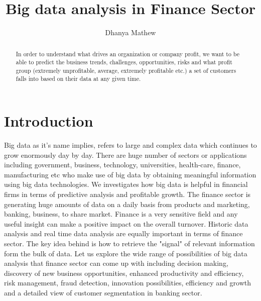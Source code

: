 \documentclass[sigconf]{acmart}
\begin{document}
\title{Big data analysis in Finance Sector}


\author{Dhanya Mathew}

\renewcommand{\shortauthors}{B. Trovato et al.}


\begin{abstract}

In order to understand what drives an organization or company profit, we want to be able to predict the business trends, challenges, opportunities, risks and what profit group (extremely unprofitable, average, extremely profitable etc.) a set of customers falls into based on their data at any given time.

\end{abstract}



\maketitle

\section{Introduction}

Big data as it's name implies, refers to large and complex data which continues to grow enormously day by day. There are huge number of sectors or applications including government, business, technology, universities, health-care, finance, manufacturing etc who make use of big data by obtaining meaningful information using big data technologies.\cite{/wiki/Big_data} We investigates how big data is helpful in financial firms in terms of predictive analysis and profitable growth. The finance sector is generating huge amounts of data on a daily basis from products and marketing, banking, business, to share market. Finance is a very sensitive field and any useful insight can make a positive impact on the overall turnover. Historic data analysis and real time data analysis are equally important in terms of finance sector. The key idea behind is how to retrieve the "signal" of relevant information form the bulk of data. Let us explore the wide range of possibilities of big data analysis that finance sector can come up with including decision making, discovery of new business opportunities, enhanced productivity and efficiency, risk management, fraud detection, innovation possibilities, efficiency and growth and a detailed view of customer segmentation in banking sector.\cite{Accenture-Next-Generation-Financial}
\end{document}
